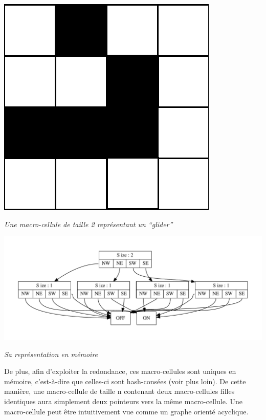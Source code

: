 \documentclass[a4paper,12pt]{report}
\begin{document}
\begin{center}
    \includegraphics[scale=0.2]{glider_mc.png}

    \textit{Une macro-cellule de taille 2 représentant un ``glider''}

    \medskip

    \includegraphics[scale=0.7]{glider.pdf}

    \textit{Sa représentation en mémoire}
\end{center}
\medskip

De plus, afin d'exploiter la redondance, ces macro-cellules sont uniques en
mémoire, c'est-à-dire que celles-ci sont hash-consées (voir plus loin). De cette
manière, une macro-cellule de taille n contenant deux macro-cellules filles
identiques aura simplement deux pointeurs vers la même macro-cellule. Une
macro-cellule peut être intuitivement vue comme un graphe orienté acyclique.

\medskip
\end{document}

